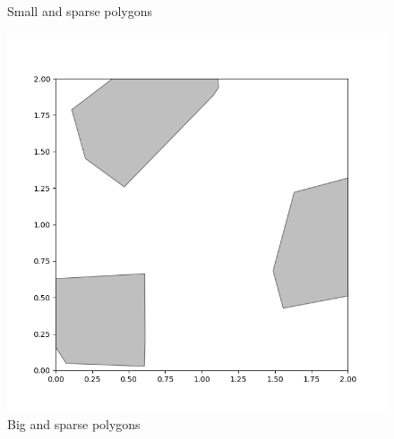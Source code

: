 \documentclass{article}
\begin{document}
\begin{figure}[htbp]
\begin{minipage}{0.45\textwidth}
    \caption{Small and sparse polygons}
  \end{minipage}\hfill
  \begin{minipage}{0.45\textwidth}
    \includegraphics[width=\linewidth]{part1_sparse_big.png}
    \caption{Big and sparse polygons}
  \end{minipage}
\end{figure}
\end{document}
